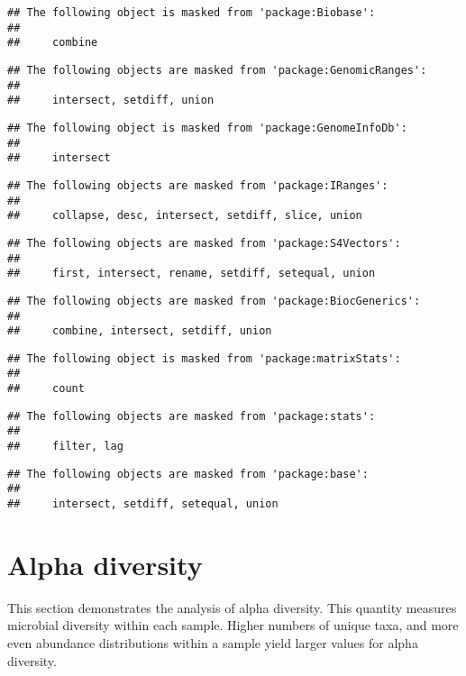 \documentclass[
  oneside]{book}
\begin{document}
\begin{verbatim}
## The following object is masked from 'package:Biobase':
## 
##     combine
\end{verbatim}

\begin{verbatim}
## The following objects are masked from 'package:GenomicRanges':
## 
##     intersect, setdiff, union
\end{verbatim}

\begin{verbatim}
## The following object is masked from 'package:GenomeInfoDb':
## 
##     intersect
\end{verbatim}

\begin{verbatim}
## The following objects are masked from 'package:IRanges':
## 
##     collapse, desc, intersect, setdiff, slice, union
\end{verbatim}

\begin{verbatim}
## The following objects are masked from 'package:S4Vectors':
## 
##     first, intersect, rename, setdiff, setequal, union
\end{verbatim}

\begin{verbatim}
## The following objects are masked from 'package:BiocGenerics':
## 
##     combine, intersect, setdiff, union
\end{verbatim}

\begin{verbatim}
## The following object is masked from 'package:matrixStats':
## 
##     count
\end{verbatim}

\begin{verbatim}
## The following objects are masked from 'package:stats':
## 
##     filter, lag
\end{verbatim}

\begin{verbatim}
## The following objects are masked from 'package:base':
## 
##     intersect, setdiff, setequal, union
\end{verbatim}

\hypertarget{alpha-diversity}{%
\chapter{Alpha diversity}\label{alpha-diversity}}

This section demonstrates the analysis of alpha diversity. This
quantity measures microbial diversity within each sample. Higher
numbers of unique taxa, and more even abundance distributions within a
sample yield larger values for alpha diversity.
\end{document}
